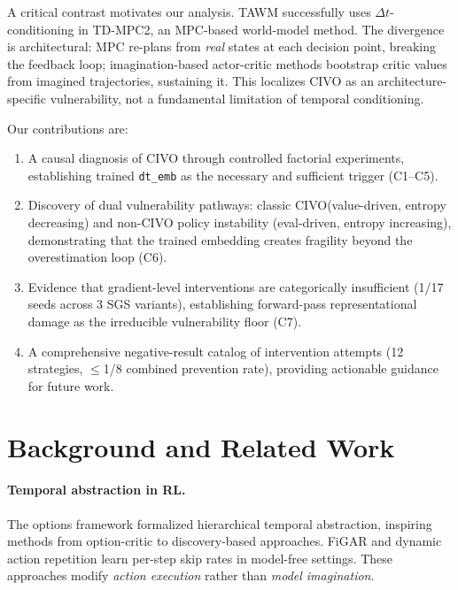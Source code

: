 \documentclass[letterpaper]{article}
\newcommand{\civo}{CIVO\xspace}
\newcommand{\dtemb}{\texttt{dt\_emb}\xspace}
\begin{document}
A critical contrast motivates our analysis. TAWM \citep{nhu2025tawm} successfully uses $\Delta t$-conditioning in TD-MPC2, an MPC-based world-model method. The divergence is architectural: MPC re-plans from \emph{real} states at each decision point, breaking the feedback loop; imagination-based actor-critic methods bootstrap critic values from imagined trajectories, sustaining it. This localizes \civo as an architecture-specific vulnerability, not a fundamental limitation of temporal conditioning.

Our contributions are:
\begin{enumerate}[nosep]
    \item A causal diagnosis of \civo through controlled factorial experiments, establishing trained \dtemb as the necessary and sufficient trigger (C1--C5).
    \item Discovery of dual vulnerability pathways: classic \civo (value-driven, entropy decreasing) and non-\civo policy instability (eval-driven, entropy increasing), demonstrating that the trained embedding creates fragility beyond the overestimation loop (C6).
    \item Evidence that gradient-level interventions are categorically insufficient (1/17 seeds across 3 SGS variants), establishing forward-pass representational damage as the irreducible vulnerability floor (C7).
    \item A comprehensive negative-result catalog of intervention attempts (12 strategies, $\leq$1/8 combined prevention rate), providing actionable guidance for future work.
\end{enumerate}

\section{Background and Related Work}

\paragraph{Temporal abstraction in RL.}
The options framework \citep{sutton1999options} formalized hierarchical temporal abstraction, inspiring methods from option-critic \citep{bacon2017option} to discovery-based approaches. FiGAR \citep{sharma2017figar} and dynamic action repetition learn per-step skip rates in model-free settings. These approaches modify \emph{action execution} rather than \emph{model imagination}.
\end{document}
